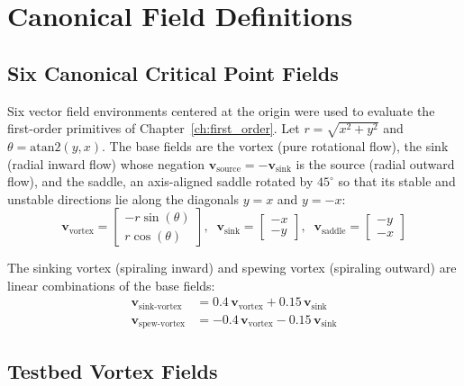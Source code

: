 \chapter{Canonical Field Definitions}
\label{app:fields}

\section{Six Canonical Critical Point Fields}
\label{sec:appA:canonical}

Six vector field environments centered at the origin were used to evaluate the first-order primitives of Chapter~\ref{ch:first_order}. Let $r = \sqrt{x^2 + y^2}$ and $\theta = \text{atan2}(y, x)$. The base fields are the vortex (pure rotational flow), the sink (radial inward flow) whose negation $\mathbf{v}_{\text{source}} = -\mathbf{v}_{\text{sink}}$ is the source (radial outward flow), and the saddle, an axis-aligned saddle rotated by $45^\circ$ so that its stable and unstable directions lie along the diagonals $y = x$ and $y = -x$:
\begin{equation}\label{eq:appA:14}
\mathbf{v}_{\text{vortex}} = \begin{bmatrix} -r \sin(\theta) \\ r \cos(\theta) \end{bmatrix}, \;\;
\mathbf{v}_{\text{sink}} = \begin{bmatrix} -x \\ -y \end{bmatrix}, \;\;
\mathbf{v}_{\text{saddle}} = \begin{bmatrix} -y \\ -x \end{bmatrix}
\end{equation}

The sinking vortex (spiraling inward) and spewing vortex (spiraling outward) are linear combinations of the base fields:
\begin{equation}\label{eq:appA:15}
\begin{aligned}
\mathbf{v}_{\text{sink-vortex}} &= 0.4\,\mathbf{v}_{\text{vortex}} + 0.15\,\mathbf{v}_{\text{sink}} \\
\mathbf{v}_{\text{spew-vortex}} &= -0.4\,\mathbf{v}_{\text{vortex}} - 0.15\,\mathbf{v}_{\text{sink}}
\end{aligned}
\end{equation}

\section{Testbed Vortex Fields}
\label{sec:appA:testbed}

